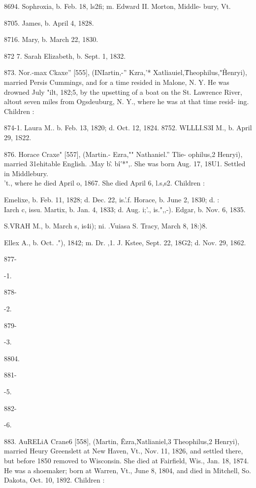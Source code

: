 8694. Sophroxia, b. Feb. 18, ls2fi; m. Edward II. Morton, Middle- 
bury, Vt. 

8705. James, b. April 4, 1828. 

8716. Mary, b. March 22, 1830. 

872  7. Sarah Elizabeth, b. Sept. 1, 1832. 

873. Nor.-max Ckaxe'' [555], (INIartin,-'' Kzra,'* Xatliauiel,\^ 
Theophilus,"\^ Henryi), married Persis Cummings, and for a time 
resided in Malone, N. Y. He was drowned July "ilt, 182;5, by 
the upsetting of a boat on the St. Lawrence River, altout seven 
miles from Ogsdeuburg, N. Y., where he was at that time resid- 
ing. Children : 

874-1. Laura M.. b. Feb. 13, 1820; d. Oct. 12, 1824. 
8752. WLLLI.S3I M., b. April 29, 1S22. 

876. Horace Craxe" [557], (Martin.- Ezra,"" Nathaniel.'' Tlie- 
ophilus,2 Henryi), married 31ehitable English. .May b\^. b\^i'*",. 
She was born Aug. 17, 18U1. Settled in Middlebury. \\'t., where 
he died April o, 1867. She died April 6, l.s,s2. Children : 

Emelixe, b. Feb. 11, 1828; d. Dec. 22, is.'.f. 
Horace, b. June 2, 1830; d. :\\Iarch c, issu. 
Martix, b. Jan. 4, 1833; d. Aug. i;'., is.",,-). 
Edgar, b. Nov. 6, 1835. 

S.VRAH M., b. March s, is4i); ni. .Vuiasa S. Tracy, March 8, 
18:)8. 

Ellex A., b. Oct. ."), 1842; m. Dr. ,1. J. Kstee, Sept. 22, 18G2; 
d. Nov. 29, 1862. 



877- 


-1. 


878- 


-2. 


879- 


-3. 


8804. 


881- 


-5. 


882- 


-6. 




883. AuRELiA Crane6 [558], (Martin, \^ Ezra,\^ Natlianiel,3 
Theophilus,2 Henryi), married Heury Greenslett at New Haven, 
Vt., Nov. 11, 1826, and settled there, but before 1850 removed 
to Wisconsin. She died at Fairfield, Wis., Jan. 18, 1874. He 
was a shoemaker; born at Warren, Vt., June 8, 1804, and died 
in Mitchell, So. Dakota, Oct. 10, 1892. Children : 

